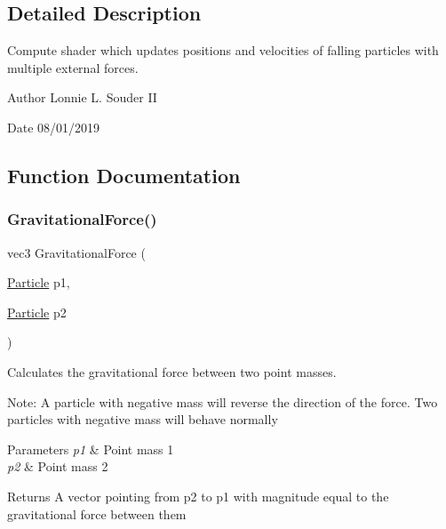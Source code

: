 \subsection{Detailed Description}
Compute shader which updates positions and velocities of falling particles with multiple external forces. 

\begin{DoxyAuthor}{Author}
Lonnie L. Souder II 
\end{DoxyAuthor}
\begin{DoxyDate}{Date}
08/01/2019 
\end{DoxyDate}


\subsection{Function Documentation}
\mbox{\label{particle__attraction_8comp_a84b4523a839013a4b2c2c9041697be0f}} 
\subsubsection{\texorpdfstring{Gravitational\+Force()}{GravitationalForce()}}
{\footnotesize\ttfamily vec3 Gravitational\+Force (\begin{DoxyParamCaption}\item[{\hyperlink{struct_particle}{Particle}}]{p1,  }\item[{\hyperlink{struct_particle}{Particle}}]{p2 }\end{DoxyParamCaption})}



Calculates the gravitational force between two point masses. 

Note\+: A particle with negative mass will reverse the direction of the force. Two particles with negative mass will behave normally


\begin{DoxyParams}{Parameters}
{\em p1} & Point mass 1 \\
\hline
{\em p2} & Point mass 2 \\
\hline
\end{DoxyParams}
\begin{DoxyReturn}{Returns}
A vector pointing from p2 to p1 with magnitude equal to the gravitational force between them 
\end{DoxyReturn}


